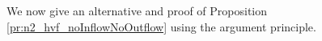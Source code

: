 We now give an alternative and proof of Proposition \ref{pr:n2_hvf_noInflowNoOutflow} using the argument principle.
